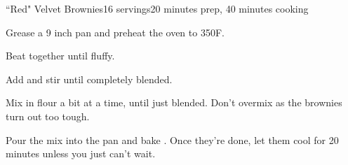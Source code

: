 \documentclass[../Cookbook.tex]{subfiles}
\begin{document}
\begin{recipe}{``Red" Velvet Brownies}{16 servings}{20 minutes prep, 40 minutes cooking}

Grease a 9 inch pan and preheat the oven to 350\0F.

Beat together until fluffy.

Add and stir until completely blended.

Mix in flour a bit at a time, until just blended. Don't overmix as the brownies turn out too tough.

\newstep
Pour the mix into the pan and bake . Once they're done, let them cool for 20 minutes unless you just can't wait.

\end{recipe}
\end{document}
